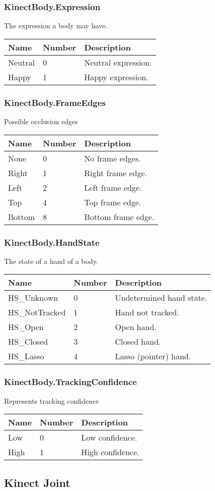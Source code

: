 \subsubsection*{KinectBody.Expression} The expression a body may have.
\begin{longtable}[l]{@{}lll@{}}
\toprule
Name & Number & Description\tabularnewline
\midrule
\endhead
Neutral & 0 & Neutral expression.\tabularnewline
Happy & 1 & Happy expression.\tabularnewline
\bottomrule
\end{longtable}
\subsubsection*{KinectBody.FrameEdges} Possible occlusion edges
\begin{longtable}[l]{@{}lll@{}}
\toprule
Name & Number & Description\tabularnewline
\midrule
\endhead
None & 0 & No frame edges.\tabularnewline
Right & 1 & Right frame edge.\tabularnewline
Left & 2 & Left frame edge.\tabularnewline
Top & 4 & Top frame edge.\tabularnewline
Bottom & 8 & Bottom frame edge.\tabularnewline
\bottomrule
\end{longtable}
\subsubsection*{KinectBody.HandState} The state of a hand of a body.
\begin{longtable}[l]{@{}lll@{}}
\toprule
Name & Number & Description\tabularnewline
\midrule
\endhead
HS\_Unknown & 0 & Undetermined hand state.\tabularnewline
HS\_NotTracked & 1 & Hand not tracked.\tabularnewline
HS\_Open & 2 & Open hand.\tabularnewline
HS\_Closed & 3 & Closed hand.\tabularnewline
HS\_Lasso & 4 & Lasso (pointer) hand.\tabularnewline
\bottomrule
\end{longtable}
\subsubsection*{KinectBody.TrackingConfidence} Represents tracking confidence
\begin{longtable}[l]{@{}lll@{}}
\toprule
Name & Number & Description\tabularnewline
\midrule
\endhead
Low & 0 & Low confidence.\tabularnewline
High & 1 & High confidence.\tabularnewline
\bottomrule
\end{longtable}
\subsection{Kinect Joint}\label{kinectux5fjoint.proto}
